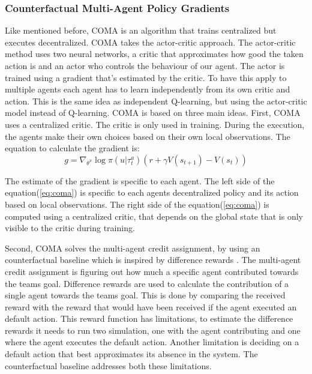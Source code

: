 \subsubsection{Counterfactual Multi-Agent Policy Gradients}

Like mentioned before, COMA is an algorithm that trains centralized but executes decentralized. COMA takes the actor-critic\citep{NIPS1999_1786} approach. The actor-critic method uses two neural networks, a critic that approximates how good the taken action is and an actor who controls the behaviour of our agent. The actor is trained using a gradient that's estimated by the critic. To have this apply to multiple agents each agent has to learn independently from its own critic and action. This is the same idea as independent Q-learning, but using the actor-critic model instead of Q-learning. COMA is based on three main ideas. First, COMA uses a centralized critic. The critic is only used in training. During the execution, the agents make their own choices based on their own local observations. The equation to calculate the gradient is:
\begin{equation} \label{eq:coma}
g=\nabla_{\theta^{\pi}} \log \pi(u | \tau_{t}^{a})\left(r+\gamma V\left(s_{t+1}\right)-V\left(s_{t}\right)\right)
\end{equation}

The estimate of the gradient is specific to each agent. The left side of the equation(\ref{eq:coma}) is specific to each agents decentralized policy and its action based on local observations. The right side of the equation(\ref{eq:coma}) is computed using a centralized critic, that depends on the global state that is only visible to the critic during training. 

Second, COMA solves the multi-agent credit assignment, by using an counterfactual baseline which is inspired by difference rewards\citep{wolpert2002optimal} \citep{tumer2007distributed}. The multi-agent credit assignment is figuring out how much a specific agent contributed towards the teams goal. Difference rewards are used to calculate the contribution of a single agent towards the teams goal. This is done by comparing the received reward with the reward that would have been received if the agent executed an default action. This reward function has limitations, to estimate the difference rewards it needs to run two simulation, one with the agent contributing and one where the agent executes the default action. Another limitation is deciding on a default action that best approximates its absence in the system. The counterfactual baseline addresses both these limitations.

